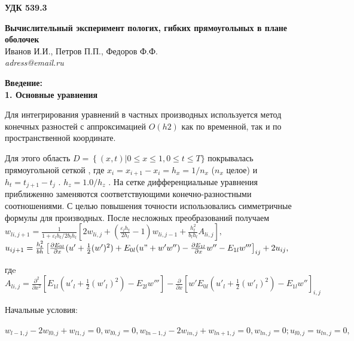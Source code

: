 \documentclass[12pt,letterpaper]{extreport}
\begin{document}
\pagestyle{empty}

\begin{flushright}
{\bfseries \large УДК 539.3}
\end{flushright}

\begin{center}
\textbf{Вычислительный эксперимент пологих, гибких 
прямоугольных в плане
оболочек}\\
Иванов И.И., Петров П.П., Федоров Ф.Ф.\\
\textit{adress@email.ru}\\
\end{center}

\textbf{Введение:\\
1.	Основные уравнения}
\par Для интегрирования уравнений в частных 
производных используется метод
конечных разностей с аппроксимацией $O(h2)$ как по 
временной, так и по
пространственной координате. 
\par Для этого область $D=\left\{(x,t)|0\leq x \leq 
1 , 0 \leq t \leq T\}
\right. $  покрывалась прямоугольной сеткой  , где 
$x_i =x_{i+1} -
x_i=h_x=1/n_x$  ($n_x$  целое) и $h_t=t_{j+1}-t_j$ 
. $h_z =1.0/h_z$ .
На сетке дифференциальные уравнения приближенно 
заменяются соответствующими
конечно-разностными соотношениями. С целью 
повышения точности использовались
симметричные формулы для производных. После 
несложных преобразований 
получаем\\
$w_{li, j+1}=\frac{1}{1+\varepsilon_l h_t /2b_l 
h_l} \left[2w_{li,j}+
(\frac{\varepsilon_l h_t}{2h_l}-1)w_{li,j-1}+
\frac{h_t^2}{b_l h_l}A_{li,j}
\right],$
\\$u_{ij+1}=\frac{h_t^2}{bh}
\left[\frac{\partial E_{0l}}{\partial
x}(u'+\frac{1}{2}(w')^2)+E_{0l}(u"+w'w'')-
\frac{\partial E_{1l}}{\partial x}w''
- E_{1l}w'''

\right]_{ij} +2u_{ij},$\\
\par гдe\\
$A_{li,j}=\frac{\partial^2}{\partial x^2}
\left[E_{1l}(u'_l +
\frac{1}{2}(w'_l)^2)-E_{2l}w'''\right] -
\frac{\partial}{\partial
x}\left[w'E_{0l}(u'_l
+\frac{1}{2}(w'_l)^2)-E_{1l}w''\right]_{i,j}$\\

\par Начальные условия:

$w_{l-1,j} - 2w_{l0,j} + w_{l1,j} = 0, w_{l0,j} = 
0, w_{ln-1,j} - 2w_{in,j} + 
w_{ln+1,j} = 0,
w_{ln,j} =0; u_{l0, j}= u_{ln,j} = 0, $
\end{document}
